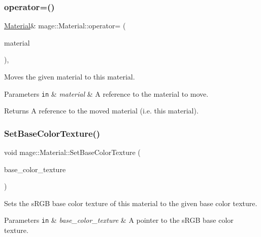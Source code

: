 \subsubsection{\texorpdfstring{operator=()}{operator=()}\hspace{0.1cm}{\footnotesize\ttfamily [2/2]}}
{\footnotesize\ttfamily \hyperlink{classmage_1_1_material}{Material}\& mage\+::\+Material\+::operator= (\begin{DoxyParamCaption}\item[{\hyperlink{classmage_1_1_material}{Material} \&\&}]{material }\end{DoxyParamCaption})\hspace{0.3cm}{\ttfamily [default]}, {\ttfamily [noexcept]}}

Moves the given material to this material.


\begin{DoxyParams}[1]{Parameters}
\mbox{\tt in}  & {\em material} & A reference to the material to move. \\
\hline
\end{DoxyParams}
\begin{DoxyReturn}{Returns}
A reference to the moved material (i.\+e. this material). 
\end{DoxyReturn}
\hypertarget{classmage_1_1_material_a85f9544a9d26f252a27a3bc6c271456a}{}\label{classmage_1_1_material_a85f9544a9d26f252a27a3bc6c271456a} 
\subsubsection{\texorpdfstring{Set\+Base\+Color\+Texture()}{SetBaseColorTexture()}}
{\footnotesize\ttfamily void mage\+::\+Material\+::\+Set\+Base\+Color\+Texture (\begin{DoxyParamCaption}\item[{\hyperlink{namespacemage_a1e01ae66713838a7a67d30e44c67703e}{Shared\+Ptr}$<$ const \hyperlink{classmage_1_1_texture}{Texture} $>$}]{base\+\_\+color\+\_\+texture }\end{DoxyParamCaption})\hspace{0.3cm}{\ttfamily [noexcept]}}

Sets the s\+R\+GB base color texture of this material to the given base color texture.


\begin{DoxyParams}[1]{Parameters}
\mbox{\tt in}  & {\em base\+\_\+color\+\_\+texture} & A pointer to the s\+R\+GB base color texture. \\
\hline
\end{DoxyParams}
\hypertarget{classmage_1_1_material_a9b0bcb448cf9c96bcb63dcbc0f110bd1}{}\label{classmage_1_1_material_a9b0bcb448cf9c96bcb63dcbc0f110bd1} 

